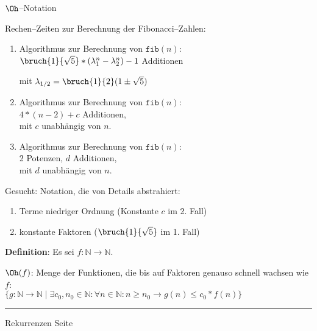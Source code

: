 
\begin{slide}{}
\normalsize

\begin{center}
$\Oh$--Notation
\end{center}
\vspace*{0.5cm}

\footnotesize
Rechen--Zeiten  zur Berechnung der Fibonacci--Zahlen:
\begin{enumerate}
\item Algorithmus zur Berechnung von $\mathtt{fib}(n)$: \\[0.3cm]
      \hspace*{1.3cm} 
      $\bruch{1}{\sqrt{5}} * (\lambda_1^n - \lambda_2^n) - 1$ Additionen

      mit $\lambda_{1/2} = \bruch{1}{2}(1 \pm \sqrt{5})$
\item Algorithmus zur Berechnung von $\mathtt{fib}(n)$: \\[0.3cm]
      \hspace*{1.3cm} 
      $4 * (n - 2) + c$ Additionen, \\[0.3cm]
      mit $c$ unabh\"angig von $n$.
\item Algorithmus zur Berechnung von $\mathtt{fib}(n)$: \\[0.3cm]
      \hspace*{1.3cm} 
      2 Potenzen, $d$ Additionen, \\[0.3cm]
      mit $d$ unabh\"angig von $n$.
\end{enumerate}
Gesucht: Notation, die von Details abstrahiert: 
\begin{enumerate}
\item Terme niedriger Ordnung (Konstante $c$ im 2. Fall)
\item konstante Faktoren ($\bruch{1}{\sqrt{5}}$ im 1. Fall)
\end{enumerate}
\textbf{Definition}: Es sei $f: \mathbb{N} \rightarrow \mathbb{N}$.  

$\Oh(f)$: Menge der Funktionen, die bis auf Faktoren genauso schnell wachsen wie $f$: \\[0.3cm]
\hspace*{-0.5cm}
 $\bigg\{ g: \mathbb{N} \rightarrow \mathbb{N} \mid \exists c_0,n_0\in\mathbb{N}:\forall n\in\mathbb{N}:n \geq n_0 \rightarrow  g(n) \leq c_0*f(n) \bigg\}$

\vspace*{\fill}
\tiny \addtocounter{mypage}{1}
\rule{17cm}{1mm}
Rekurrenzen  \hspace*{\fill} Seite 
\end{slide}

